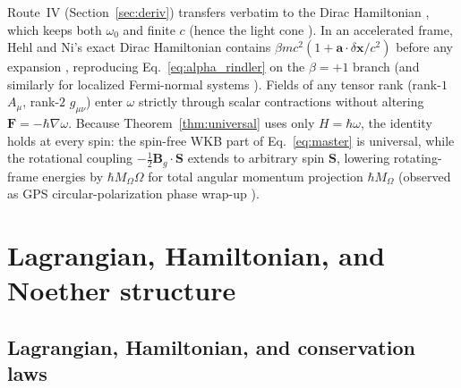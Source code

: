 \documentclass[aps,prd,onecolumn,tightenlines,nofootinbib,notitlepage,10pt,floatfix]{revtex4-2}
\theoremstyle{indentedtheorem}
\begin{document}
Route~IV (Section~\ref{sec:deriv}) transfers verbatim to the Dirac Hamiltonian \citep{Dirac1928Quantum}, which keeps both $\omega_0$ and finite $c$ (hence the light cone \citep{Thaller1992Dirac}). In an accelerated frame, Hehl and Ni's exact Dirac Hamiltonian contains $\beta mc^2(1+\mathbf{a}\cdot\delta\mathbf{x}/c^2)$ before any expansion \citep{HehlNi1990Inertial}, reproducing Eq.~\eqref{eq:alpha_rindler} on the $\beta=+1$ branch (and similarly for localized Fermi-normal systems \citep{Perche2022Localized}). Fields of any tensor rank (rank-$1$ $A_\mu$, rank-$2$ $g_{\mu\nu}$) enter $\omega$ strictly through scalar contractions without altering $\mathbf{F}=-\hbar\nabla\omega$. Because Theorem~\ref{thm:universal} uses only $H=\hbar\omega$, the identity holds at every spin: the spin-free WKB part of Eq.~\eqref{eq:master} is universal, while the rotational coupling $-\tfrac{1}{2}\mathbf{B}_g\cdot\mathbf{S}$ extends to arbitrary spin $\mathbf{S}$, lowering rotating-frame energies by $\hbar M_\Omega\Omega$ for total angular momentum projection $\hbar M_\Omega$ \citep{Mashhoon1998Helicity} (observed as GPS circular-polarization phase wrap-up \citep{Ashby2003Relativity}).

\section{Lagrangian, Hamiltonian, and Noether structure}
\label{sec:canonical}

\subsection{Lagrangian, Hamiltonian, and conservation laws}
\label{sec:lagrangian}
\end{document}
